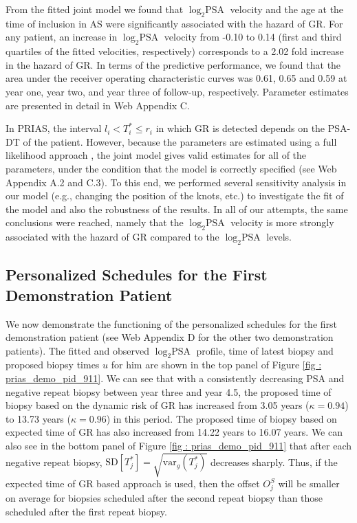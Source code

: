 From the fitted joint model we found that $\log_2 \mbox{PSA}$ velocity and the age at the time of inclusion in AS were significantly associated with the hazard of GR. For any patient, an increase in $\log_2 \mbox{PSA}$ velocity from -0.10 to 0.14 (first and third quartiles of the fitted velocities, respectively) corresponds to a 2.02 fold increase in the hazard of GR. In terms of the predictive performance, we found that the area under the receiver operating characteristic curves \citep{landmarking2017} was 0.61, 0.65 and 0.59 at year one, year two, and year three of follow-up, respectively. Parameter estimates are presented in detail in Web Appendix C.

In PRIAS, the interval $l_i < T_i^* \leq r_i$ in which GR is detected depends on the PSA-DT of the patient. However, because the parameters are estimated using a full likelihood approach \citep{tsiatis2004joint}, the joint model gives valid estimates for all of the parameters, under the condition that the model is correctly specified (see Web Appendix A.2 and C.3). To this end, we performed several sensitivity analysis in our model (e.g., changing the position of the knots, etc.) to investigate the fit of the model and also the robustness of the results. In all of our attempts, the same conclusions were reached, namely that the $\log_2 \mbox{PSA}$ velocity is more strongly associated with the hazard of GR compared to the $\log_2 \mbox{PSA}$ levels.

\subsection{Personalized Schedules for the First Demonstration Patient}
\label{subsec : demo_prias_pers_schedule}
We now demonstrate the functioning of the personalized schedules for the first demonstration patient (see Web Appendix D for the other two demonstration patients). The fitted and observed $\log_2 \mbox{PSA}$ profile, time of latest biopsy and proposed biopsy times $u$ for him are shown in the top panel of Figure \ref{fig : prias_demo_pid_911}. We can see that with a consistently decreasing PSA and negative repeat biopsy between year three and year 4.5, the proposed time of biopsy based on the dynamic risk of GR has increased from 3.05 years ($\kappa=0.94$) to 13.73 years ($\kappa=0.96$) in this period. The proposed time of biopsy based on expected time of GR has also increased from 14.22 years to 16.07 years. We can also see in the bottom panel of Figure \ref{fig : prias_demo_pid_911} that after each negative repeat biopsy, $\mbox{SD}[T^*_j] = \sqrt{\mbox{var}_g(T^*_j)}$ decreases sharply. Thus, if the expected time of GR based approach is used, then the offset $O^S_j$ will be smaller on average for biopsies scheduled after the second repeat biopsy than those scheduled after the first repeat biopsy.

